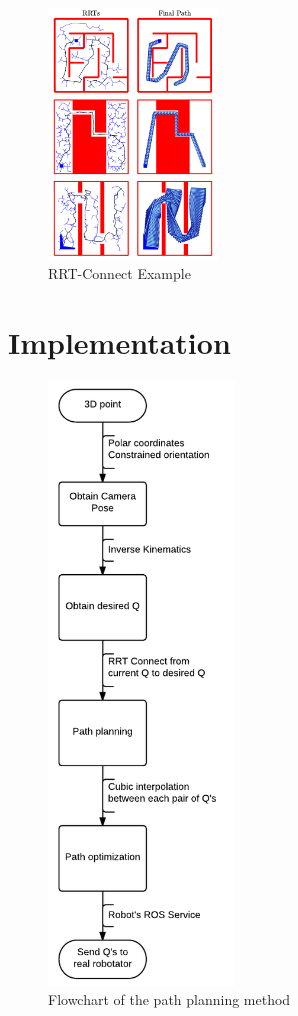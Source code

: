 \begin{figure}[!ht]
	\centering
	\includegraphics[width=0.4\textwidth]{figures/rrt_connect}
	\caption{RRT-Connect Example}
	\label{fig:rrt_connect}
\end{figure}


\section{Implementation} %
\label{sec:implementation}
\begin{figure}[!hb]
	\centering
	\includegraphics[height=16cm]{figures/path_planning_flowchart}
	\caption{Flowchart of the path planning method}
	\label{fig:path_planning_flowchart}
\end{figure}

